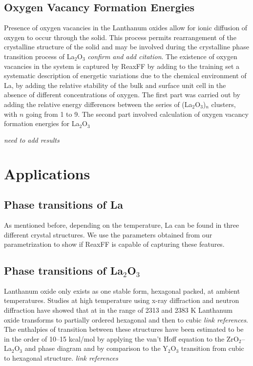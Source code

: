 \documentclass[journal=jpcafh,manuscript=article]{achemso}
\begin{document}
\subsection{Oxygen Vacancy Formation Energies}

Presence of oxygen vacancies in the Lanthanum oxides allow for ionic diffusion of oxygen to occur through the solid.
This process permits rearrangement of the crystalline structure of the solid and may be involved during the crystalline phase transition process of La$_2$O$_3$ \emph{confirm and add citation}.
The existence of oxygen vacancies in the system is captured by ReaxFF by adding to the training set a systematic description of energetic variations due to the chemical environment of La, by adding the relative stability of the bulk and surface unit cell in the absence of different concentrations of oxygen.
The first part was carried out by adding the relative energy differences between the series of (La$_2$O$_3$)$_n$ clusters, with $n$ going from 1 to 9.
The second part involved calculation of oxygen vacancy formation energies for La$_2$O$_3$

\emph{need to add results}


\section{Applications}
\label{sec:applications}

\subsection{Phase transitions of La}

As mentioned before, depending on the temperature, La can be found in three different crystal structures.
We use the parameters obtained from our parametrization to show if ReaxFF is capable of capturing these features.

\subsection{Phase transitions of La$_2$O$_3$}

Lanthanum oxide only exists as one stable form, hexagonal packed, at ambient temperatures.
Studies at high temperature using x-ray diffraction and neutron diffraction have showed that at in the range of 2313 and 2383 K Lanthanum oxide transforms to partially ordered hexagonal and then to cubic \emph{link references}.
The enthalpies of transition between these structures have been estimated to be in the order of 10--15 kcal/mol by applying the van't Hoff equation to the ZrO$_2$--La$_2$O$_3$ and phase diagram and by comparison to the Y$_2$O$_3$ transition from cubic to hexagonal structure. \emph{link references}
\end{document}

